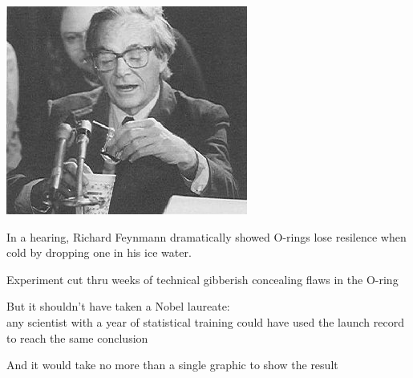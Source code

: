 \documentclass[11pt]{beamer}
\begin{document}

\begin{frame}


\begin{center}
\includegraphics[scale=.6]{feynnman.jpg}
\end{center}
\begin{footnotesize}

In a hearing, Richard Feynmann dramatically showed O-rings lose resilence when cold by dropping one in his ice water.

Experiment cut thru weeks of technical gibberish concealing flaws in the O-ring

But it shouldn't have taken a Nobel laureate: \\ 
any scientist with a year of statistical training could have used the launch record to reach the same conclusion

And it would take no more than a single graphic to show the result
\end{footnotesize}

\end{frame}

\end{document}
